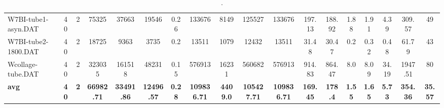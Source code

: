 \begin{sidewaystable}[h]
{\begin{tabular}{lccccccccccccccccc}
W7BI-tube1-asyn.DAT & 40 & 2 & 75325 & 37663 & 19546 & 0.26 & 133676 & 8149 & 125527 & 133676 & 197.13 & 188.92 & 1.88 & 1.91 & 4.39 & 309.57 & 49\\
W7BI-tube2-1800.DAT & 40 & 2 & 18725 & 9363 & 3735 & 0.2 & 13511 & 1079 & 12432 & 13511 & 31.48 & 30.47 & 0.2 & 0.32 & 0.48 & 61.79 & 43\\
Wcollage-tube.DAT & 40 & 2 & 323035 & 161518 & 48231 & 0.15 & 576913 & 16231 & 560682 & 576913 & 914.83 & 864.47 & 8.0 & 8.09 & 34.19 & 1947.51 & 80\\
\cline{1-18} \textbf{avg} & \textbf{40} & \textbf{2} & \textbf{66982.71} & \textbf{33491.86} & \textbf{12496.57} & \textbf{0.28} & \textbf{109836.71} & \textbf{4409.0} & \textbf{105427.71} & \textbf{109836.71} & \textbf{169.45} & \textbf{178.4} & \textbf{1.55} & \textbf{1.65} & \textbf{5.73} & \textbf{354.36} & \textbf{35.57} \\ \cline{1-18}
\bottomrule
\end{tabular}%
}%
\caption{.}
\label{tab:table_bc}
\end{sidewaystable}

